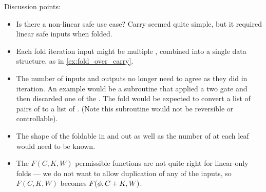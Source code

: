 Discussion points:
\begin{itemize}
  \item Is there a non-linear safe use case? Carry seemed quite simple,
    but it required linear safe inputs when folded.
  \item Each fold iteration input might be multiple ,
    combined into a single data structure, as in 
    \vref{ex:fold_over_carry}.
  \item The number of inputs and outputs no longer need
    to agree as they did in iteration.  An example would be a subroutine that
    applied a two \qubit gate and then discarded one of the \qubits.
    The fold would be expected to convert a list of pairs  of 
    to a list of . (Note this subroutine would not be reversible
    or controllable).
  \item The shape of the foldable in and out as well as the number of \qubits
    at each leaf would need to be known.
  \item The $F(C,K,W)$ permissible functions are not quite right for
    linear-only folds --- we do not want to allow duplication of any of
    the inputs, so $F(C,K,W)$ becomes $F(\phi,C+K,W)$.
\end{itemize}

